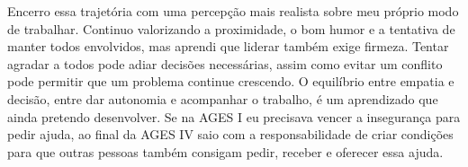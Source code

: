 Encerro essa trajetória com uma percepção mais realista sobre meu próprio modo
de trabalhar. Continuo valorizando a proximidade, o bom humor e a tentativa de
manter todos envolvidos, mas aprendi que liderar também exige firmeza. Tentar
agradar a todos pode adiar decisões necessárias, assim como evitar um conflito
pode permitir que um problema continue crescendo. O equilíbrio entre empatia e
decisão, entre dar autonomia e acompanhar o trabalho, é um aprendizado que ainda
pretendo desenvolver. Se na AGES I eu precisava vencer a insegurança para pedir
ajuda, ao final da AGES IV saio com a responsabilidade de criar condições para
que outras pessoas também consigam pedir, receber e oferecer essa ajuda.
